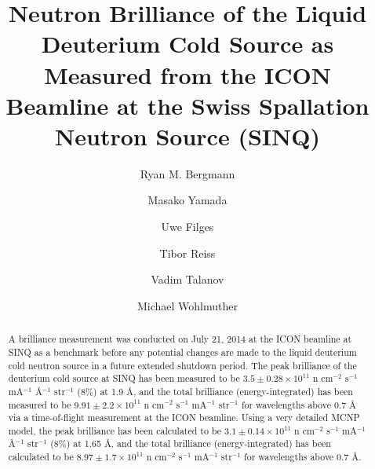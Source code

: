 \documentclass[5p,12pt]{elsarticle}
\begin{document}
\begin{frontmatter}



\title{Neutron Brilliance of the Liquid Deuterium Cold Source as Measured from the ICON Beamline at the Swiss Spallation Neutron Source (SINQ)}


\author[]{Ryan M. Bergmann}

\author[]{Masako Yamada}

\author[]{Uwe Filges}

\author[]{Tibor Reiss}

\author[]{Vadim Talanov}

\author[]{Michael Wohlmuther}

\address{Paul Scherrer Institut, Villigen, Switzerland}


\begin{abstract}

A brilliance measurement was conducted on July 21, 2014 at the ICON beamline at SINQ as a benchmark before any potential changes are made to the liquid deuterium cold neutron source in a future extended shutdown period.  The peak brilliance of the deuterium cold source at SINQ has been measured to be $3.5 \pm 0.28\times10^{11}$ n cm$^{-2}$ s$^{-1}$ mA$^{-1}$ \AA$^{-1}$ str$^{-1}$ (8\%) at 1.9 {\AA}, and the total brilliance (energy-integrated) has been measured to be  $9.91 \pm 2.2\times10^{11}$  n cm$^{-2}$ s$^{-1}$ mA$^{-1}$ str$^{-1}$ for wavelengths above 0.7 {\AA} via a time-of-flight measurement at the ICON beamline.  Using a very detailed MCNP model, the peak brilliance has been calculated to be $3.1 \pm 0.14\times10^{11}$ n cm$^{-2}$ s$^{-1}$ mA$^{-1}$ \AA$^{-1}$ str$^{-1}$ (8\%) at 1.65 {\AA}, and the total brilliance (energy-integrated) has been calculated to be  $8.97 \pm 1.7\times10^{11}$  n cm$^{-2}$ s$^{-1}$ mA$^{-1}$ str$^{-1}$ for wavelengths above 0.7 {\AA}.


\end{abstract}
\end{frontmatter}
\end{document}
